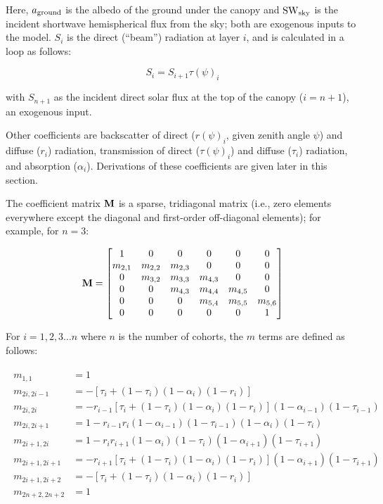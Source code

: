Here, $a_{\mathrm{ground}}$ is the albedo of the ground under the canopy and $\mathrm{SW}_{\mathrm{sky}}$ is the incident shortwave hemispherical flux from the sky;
both are exogenous inputs to the model.
$S_i$ is the direct (``beam'') radiation at layer $i$, and is calculated in a loop as follows:

\begin{equation}
  S_i = S_{i + 1} \tau(\psi)_i
\end{equation}

with $S_{n+1}$ as the incident direct solar flux at the top of the canopy ($i = n + 1$), an exogenous input.

Other coefficients are
backscatter of direct ($r(\psi)_{i}$, given zenith angle $\psi$) and diffuse ($r_{i}$) radiation,
transmission of direct ($\tau(\psi)_{i}$) and diffuse ($\tau_{i}$) radiation,
and absorption ($\alpha_{i}$).
Derivations of these coefficients are given later in this section.

The coefficient matrix $\mathbf{M}$ is a sparse, tridiagonal matrix (i.e., zero elements everywhere except the diagonal and first-order off-diagonal elements); for example, for $n=3$:

\begin{equation}
  \mathbf{M} = \begin{bmatrix}
    1 & 0 & 0 & 0 & 0 & 0 \\
    m_{2,1} & m_{2,2} & m_{2,3} & 0 & 0 & 0 \\
    0 & m_{3,2} & m_{3,3} & m_{4,3} & 0 & 0 \\
    0 & 0 & m_{4,3} & m_{4,4} & m_{4,5} & 0 \\
    0 & 0 & 0 & m_{5,4} & m_{5,5} & m_{5,6} \\
    0 & 0 & 0 & 0 & 0 & 1 \\
  \end{bmatrix}
\end{equation}

For $i = 1,2,3...n$ where $n$ is the number of cohorts, the $m$ terms are defined as follows:

\begin{align}
  \begin{split}
    m_{1,1} &= 1\\
    m_{2i,2i-1} &= - \left[ \tau_i + (1 - \tau_i)(1 - \alpha_i)(1 - r_i) \right]\\
    m_{2i,2i} &= -r_{i-1} \left[ \tau_i + (1 - \tau_i)(1 - \alpha_i)(1 - r_i) \right] (1 - \alpha_{i-1})(1 - \tau_{i-1})\\
    m_{2i,2i+1} &= 1 - r_{i-1} r_i (1 - \alpha_{i-1})(1 - \tau_{i-1})(1 - \alpha_i)(1 - \tau_i)\\
    m_{2i+1,2i} &= 1 - r_i r_{i+1} (1 - \alpha_i)(1 - \tau_i)(1 - \alpha_{i+1})(1 - \tau_{i+1})\\
    m_{2i+1,2i+1} &= -r_{i+1} \left[ \tau_i + (1 - \tau_i)(1 - \alpha_i)(1 - r_i) \right] (1 - \alpha_{i+1})(1 - \tau_{i+1})\\
    m_{2i+1,2i+2} &= - \left[ \tau_i + (1 - \tau_i)(1 - \alpha_i)(1 - r_i) \right]\\
    m_{2n+2,2n+2} &= 1
  \end{split}
\end{align}

